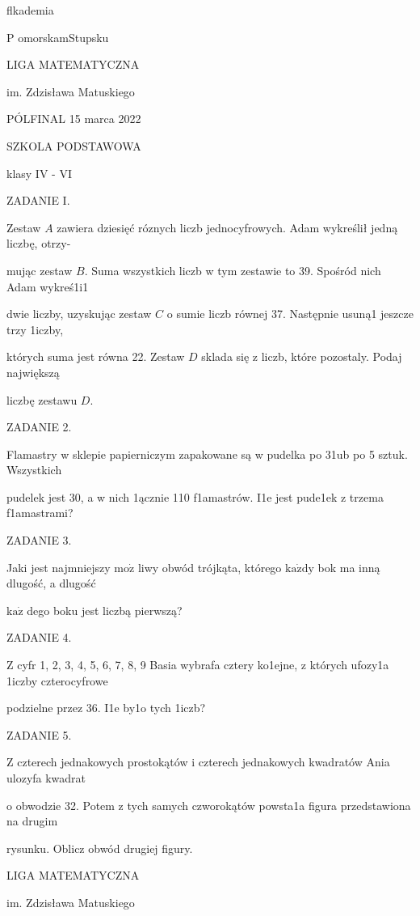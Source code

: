 \documentclass[a4paper,12pt]{article}
\begin{document}
flkademia

P omorskamStupsku

LIGA MATEMATYCZNA

im. Zdzisława Matuskiego

PÓLFINAL 15 marca 2022

SZKOLA PODSTAWOWA

klasy IV - VI

ZADANIE I.

Zestaw $A$ zawiera dziesięć róznych liczb jednocyfrowych. Adam wykreślił jedną liczbę, otrzy-

mując zestaw $B$. Suma wszystkich liczb w tym zestawie to 39. Spośród nich Adam wykreś1i1

dwie liczby, uzyskując zestaw $C$ o sumie liczb równej 37. Następnie usuną1 jeszcze trzy 1iczby,

których suma jest równa 22. Zestaw $D$ sklada się z liczb, które pozostaly. Podaj największą

liczbę zestawu $D.$

ZADANIE 2.

Flamastry w sklepie papierniczym zapakowane są w pudelka po 31ub po 5 sztuk. Wszystkich

pudelek jest 30, a w nich 1ącznie 110 f1amastrów. I1e jest pude1ek z trzema f1amastrami?

ZADANIE 3.

Jaki jest najmniejszy $\mathrm{m}\mathrm{o}\dot{\mathrm{z}}$ liwy obwód trójkąta, którego $\mathrm{k}\mathrm{a}\dot{\mathrm{z}}\mathrm{d}\mathrm{y}$ bok ma inną dlugość, a dlugość

$\mathrm{k}\mathrm{a}\dot{\mathrm{z}}$ dego boku jest liczbą pierwszą?

ZADANIE 4.

$\mathrm{Z}$ cyfr 1, 2, 3, 4, 5, 6, 7, 8, 9 Basia wybrafa cztery ko1ejne, z których ufozy1a 1iczby czterocyfrowe

podzielne przez 36. I1e by1o tych 1iczb?

ZADANIE 5.

$\mathrm{Z}$ czterech jednakowych prostokątów i czterech jednakowych kwadratów Ania ulozyfa kwadrat

o obwodzie 32. Potem z tych samych czworokątów powsta1a figura przedstawiona na drugim

rysunku. Oblicz obwód drugiej figury.






LIGA MATEMATYCZNA

im. Zdzisława Matuskiego
\end{document}
